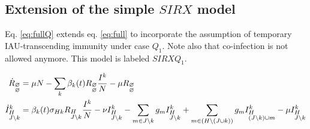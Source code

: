 \clearpage




\subsection{Extension of the simple $SIRX$ model}

Eq. \eqref{eq:fullQ} extends eq. \ref{eq:full} to incorporate the
assumption of temporary IAU-transcending immunity under case $Q_{1}$.
Note also that co-infection is not allowed anymore. This model is
labeled $SIRXQ_{1}$.

\begin{footnotesize}
  \begin{align}
    \label{eq:fullQ}
    \dot{R}_{\begin{subarray}{l}\varnothing \\
        \varnothing \end{subarray}} &= \mu N -\sum_k \beta_k(t) R_{\begin{subarray}{l}\varnothing \\ \varnothing \end{subarray}} \frac{I^k}{N} - \mu R_{\begin{subarray}{l}\varnothing \\ \varnothing \end{subarray}}\\
    \dot{I}^k_{\begin{subarray}{l}H\\ J \setminus k \end{subarray}} &=
    \beta_k(t) \sigma_{Hk} R_{\begin{subarray}{l}H \\ J\setminus
        k \end{subarray}} \frac{I^k}{N} -\nu I^k_{\begin{subarray}{l}H
        \\ J \setminus k \end{subarray}} -\sum_{m \in J \setminus k}
    g_m I^k_{\begin{subarray}{l}H \\ J \setminus k \end{subarray}} +
    \sum_{m \in (H \setminus (J \cup k))} g_m
    I^k_{\begin{subarray}{l}H \\ (J \setminus k) \cup
        m \end{subarray}}
    -\mu I^k_{\begin{subarray}{l}H \\ J \setminus k \end{subarray}} \notag \\

\end{align}
\end{footnotesize}
